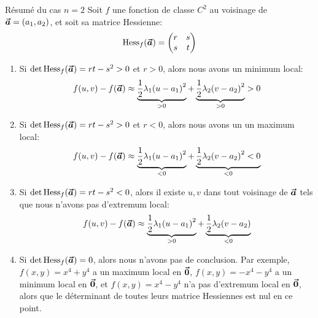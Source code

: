 \documentclass[a4paper]{article}
\begin{document}
\begin{parag}{Résumé du cas $n = 2$}
    Soit $f$ une fonction de classe $C^2$ au voisinage de $\bvec{a} = \left(a_1, a_2\right)$, et soit sa matrice Hessienne: 
    \[\Hess_f\left(\bvec{a}\right) = \begin{pmatrix} r & s \\ s & t \end{pmatrix} \]
    
    \begin{enumerate}[left=0pt]
        \item Si $\det\Hess_f\left(\bvec{a}\right) = rt - s^2 > 0$ et $r > 0$, alors nous avons un minimum local: 
        \[f\left(u, v\right) - f\left(\bvec{a}\right) \approx \underbrace{\frac{1}{2} \lambda_1 \left(u - a_1\right)^2}_{> 0} + \underbrace{\frac{1}{2} \lambda_2 \left(v - a_2\right)^2}_{> 0} > 0\]
        \item Si $\det\Hess_f\left(\bvec{a}\right) = rt - s^2 > 0$ et $r < 0$, alors nous avons un un maximum local: 
        \[f\left(u, v\right) - f\left(\bvec{a}\right) \approx \underbrace{\frac{1}{2} \lambda_1 \left(u - a_1\right)^2}_{< 0} + \underbrace{\frac{1}{2} \lambda_2 \left(v - a_2\right)^2 < 0}_{< 0}\]
    \item Si $\det\Hess_f\left(\bvec{a}\right) = rt - s^2 < 0$, alors il existe $u, v$ dans tout voisinage de $\bm{\protect\vec{a}}$ tels que nous n'avons pas d'extremum local: 
        \[f\left(u, v\right) - f\left(\bvec{a}\right) \approx \underbrace{\frac{1}{2} \lambda_1 \left(u - a_1\right)^2}_{> 0} + \underbrace{\frac{1}{2} \lambda_2 \left(v - a_2\right)}_{< 0}\]
    
    \item Si $\det\Hess_f\left(\bvec{a}\right) = 0$, alors nous n'avons pas de conclusion. Par exemple, $f\left(x, y\right) = x^4 + y^4$ a un maximum local en $\bm{\protect\vec{0}}$, $f\left(x,y\right) = -x^4 - y^4$ a un minimum local en $\bm{\protect\vec{0}}$, et $f\left(x, y\right) = x^4 - y^4$ n'a pas d'extremum local en $\bm{\protect\vec{0}}$, alors que le déterminant de toutes leurs matrice Hessiennes est nul en ce point.
    \end{enumerate}
\end{parag}
\end{document}
